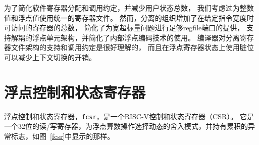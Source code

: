 \begin{commentary}
  为了简化软件寄存器分配和调用约定，并减少用户状态总数，
  我们考虑过为整数值和浮点值使用统一的寄存器文件。
  然而，分离的组织增加了在给定指令宽度时可访问的寄存器的总数，
  简化了为宽超标量问题进行足够regfile端口的提供，
  支持解耦的浮点单元架构，并简化了内部浮点编码技术的使用。
  编译器对分离寄存器文件架构的支持和调用约定是很好理解的，
  而且在浮点寄存器状态上使用脏位可以减少上下文切换的开销。
\end{commentary}

\clearpage

\section{浮点控制和状态寄存器}

浮点控制和状态寄存器，{\tt fcsr}，是一个RISC-V控制和状态寄存器（CSR）。
它是一个32位的读/写寄存器，为浮点算数操作选择动态的舍入模式，并持有累积的异常标志，如图~\ref{fcsr}中显示的那样。


